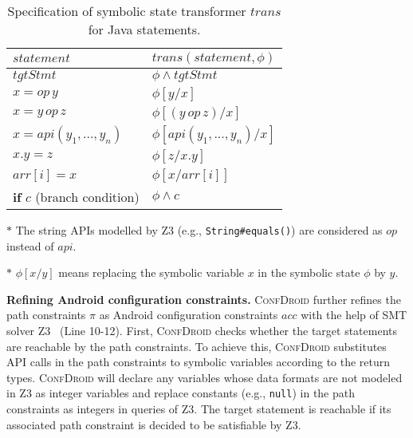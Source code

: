 \begin{table}[t]
	  \begin{threeparttable}[b]
		\caption{Specification of symbolic state transformer $trans$ for Java statements.}
	\label{tab:wp}
	\begin{tabular}{p{3.5cm}|p{4.5cm}}
		\toprule
		$statement$ & $trans(statement, \phi)$ \\ \midrule
		$tgtStmt$  & $\phi \wedge tgtStmt$ \\
		$x = op\, y$& $\phi[y/x]$     \\
		$x = y\, op \, z$ & $\phi[(y \, op \, z)/ x]$      \\
		$x = api(y_1, ..., y_n)$&  $\phi[api(y_1, ..., y_n)/ x]$    \\
		$x.y = z$&   $\phi[z/x.y]$   \\
		$arr[i] = x$&$\phi[x/arr[i]]$ \\
		\textbf{if} $c$ (branch condition) & $\phi \wedge c$ \\
		\bottomrule
	\end{tabular}
   \begin{tablenotes}
	\item $*$ The string APIs modelled by Z3 (e.g., \texttt{String\#equals()}) are considered as $op$ instead of $api$.
	\item $*$ $\phi[x/y]$ means replacing the symbolic variable $x$ in the symbolic state $\phi$ by $y$.
	\end{tablenotes}
	\end{threeparttable}
\end{table}

\textbf{Refining Android configuration constraints.}
\textsc{ConfDroid} further refines the path constraints $\pi$ as Android configuration constraints $acc$ with the help of SMT solver Z3~\cite{z3} (Line 10-12).
First, \textsc{ConfDroid} checks whether the target statements are reachable by the path constraints.
To achieve this, \textsc{ConfDroid} substitutes API calls in the path constraints to symbolic variables according to the return types.
\textsc{ConfDroid} will declare any variables whose data formats are not modeled in Z3 as integer variables and replace constants (e.g., \texttt{null}) in the path constraints as integers in queries of Z3.
The target statement is reachable if its associated path constraint is decided to be satisfiable by Z3.

